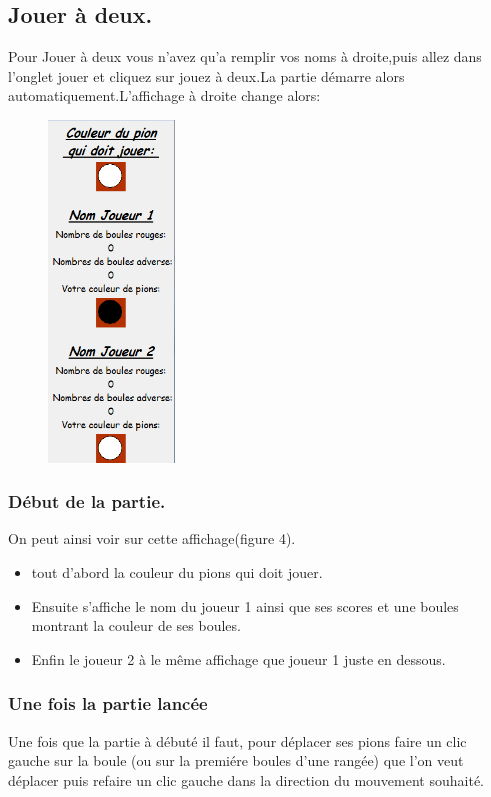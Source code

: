 \documentclass{article}
\begin{document}
\subsection{Jouer à deux.}
Pour Jouer à deux vous n'avez qu'a remplir vos noms à droite,puis allez dans l'onglet jouer et cliquez sur jouez à deux.La partie démarre alors automatiquement.L'affichage à droite change alors:
\begin{figure}[!h]
\centerline{\includegraphics[width=0.3\textwidth]{images/Affichage_Jouer_deux.png}}
\vspace{0.5cm}
\caption{}
\end{figure}
\newpage{}
\subsubsection{Début de la partie.} On peut ainsi voir sur cette affichage(figure 4).
\begin{itemize}
\item tout d'abord la couleur du pions qui doit jouer.
\item Ensuite s'affiche le nom du joueur 1 ainsi que ses scores et une boules montrant la couleur de ses boules. 
\item Enfin le joueur 2 à le même affichage que joueur 1 juste en dessous.
\end{itemize}
\subsubsection{Une fois la partie lancée}
Une fois que la partie à débuté il faut, pour déplacer ses pions faire un clic gauche sur la boule (ou sur la premiére boules d'une rangée) que l'on veut déplacer puis refaire un clic gauche dans la direction du mouvement souhaité.
\end{document}
